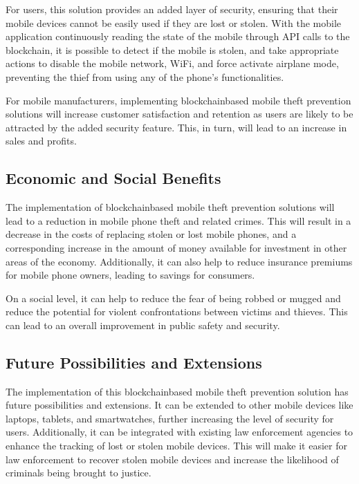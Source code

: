 \documentclass[letterpaper,10pt,english]{jupyterBook}
\begin{document}
\sphinxAtStartPar
For users, this solution provides an added layer of security, ensuring that their mobile devices cannot be easily used if they are lost or stolen. With the mobile application continuously reading the state of the mobile through API calls to the blockchain, it is possible to detect if the mobile is stolen, and take appropriate actions to disable the mobile network, Wi\sphinxhyphen{}Fi, and force activate airplane mode, preventing the thief from using any of the phone’s functionalities.

\sphinxAtStartPar
For mobile manufacturers, implementing blockchain\sphinxhyphen{}based mobile theft prevention solutions will increase customer satisfaction and retention as users are likely to be attracted by the added security feature. This, in turn, will lead to an increase in sales and profits.


\subsection{Economic and Social Benefits}
\label{\detokenize{MTP/mtp:economic-and-social-benefits}}
\sphinxAtStartPar
The implementation of blockchain\sphinxhyphen{}based mobile theft prevention solutions will lead to a reduction in mobile phone theft and related crimes. This will result in a decrease in the costs of replacing stolen or lost mobile phones, and a corresponding increase in the amount of money available for investment in other areas of the economy. Additionally, it can also help to reduce insurance premiums for mobile phone owners, leading to savings for consumers.

\sphinxAtStartPar
On a social level, it can help to reduce the fear of being robbed or mugged and reduce the potential for violent confrontations between victims and thieves. This can lead to an overall improvement in public safety and security.


\subsection{Future Possibilities and Extensions}
\label{\detokenize{MTP/mtp:future-possibilities-and-extensions}}
\sphinxAtStartPar
The implementation of this blockchain\sphinxhyphen{}based mobile theft prevention solution has future possibilities and extensions. It can be extended to other mobile devices like laptops, tablets, and smartwatches, further increasing the level of security for users. Additionally, it can be integrated with existing law enforcement agencies to enhance the tracking of lost or stolen mobile devices. This will make it easier for law enforcement to recover stolen mobile devices and increase the likelihood of criminals being brought to justice.
\end{document}
